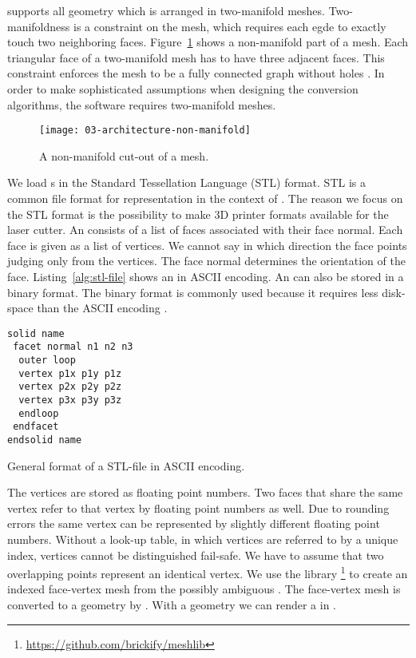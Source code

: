 \documentclass[../../ClassicThesis.tex]{subfiles}
\begin{document}
{\platener} supports all geometry which is arranged in two-manifold
meshes. Two-manifoldness is a constraint on the mesh, which requires
each egde to exactly touch two neighboring faces.
Figure~\ref{fig:non-manifold} shows a non-manifold part of a mesh.
Each triangular face of a two-manifold mesh has to have three adjacent
faces. This constraint enforces the mesh to be a fully connected graph
without holes \cite[p.~28]{master-thesis}. In order to make
sophisticated assumptions when designing the conversion algorithms,
the software requires two-manifold meshes.

\begin{figure}[h]
  \centering
  \texttt{[image: 03-architecture-non-manifold]}
  \caption{A non-manifold cut-out of a mesh.}
  \label{fig:non-manifold}
\end{figure}

We load {\threedmodel}s in the Standard Tessellation
Language (STL) format. STL is a common file format for
{\threedmodel} representation in the context of
{\threedprinting}. The reason we focus on the STL format is
the possibility to make 3D printer formats available for the
laser cutter. An {\stlfile} consists of a list of faces
associated with their face normal. Each face is given as a
list of vertices. We cannot say in which direction the face
points judging only from the vertices. The face normal
determines the orientation of the face.
Listing~\ref{alg:stl-file} shows an {\stlfile} in ASCII
encoding. An {\stlfile} can also be stored in a binary
format. The binary format is commonly used because it
requires less disk-space than the ASCII encoding
\cite[p.~8]{stl-file}.

\begin{listing}
\begin{verbatim}
solid name
 facet normal n1 n2 n3
  outer loop
  vertex p1x p1y p1z
  vertex p2x p2y p2z
  vertex p3x p3y p3z
  endloop
 endfacet
endsolid name
\end{verbatim}
\caption{General format of a STL-file in ASCII encoding.}
\label{alg:stl-file}
\end{listing}

The vertices are stored as floating point numbers. Two faces
that share the same vertex refer to that vertex by
floating point numbers as well. Due to rounding errors the
same vertex can be represented by slightly different
floating point numbers. Without a look-up table, in which
vertices are referred to by a unique index, vertices cannot
be distinguished fail-safe. We have to assume that two
overlapping points represent an identical vertex. We use the
library
{\meshlib}\footnote{\url{https://github.com/brickify/meshlib}}
to create an indexed face-vertex mesh from the possibly
ambiguous {\stlfile}. The face-vertex mesh is converted to a
{\threejs} geometry by {\meshlib}. With a {\threejs}
geometry we can render a {\threedmodel} in {\convertify}.
\end{document}

